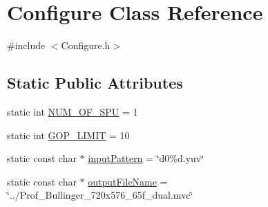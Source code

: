\hypertarget{class_configure}{
\section{Configure Class Reference}
\label{class_configure}
}


{\ttfamily \#include $<$Configure.h$>$}

\subsection*{Static Public Attributes}
\begin{DoxyCompactItemize}
\item 
static int \hyperlink{class_configure_ac48067b7f9d47427e932b4c44f4c9248}{NUM\_\-OF\_\-SPU} = 1
\item 
static int \hyperlink{class_configure_a0a595a8bf2825d2238fa77b2ecff2c5a}{GOP\_\-LIMIT} = 10
\item 
static const char $\ast$ \hyperlink{class_configure_aa6d6606a0e2fb33b2f828f207df7e140}{inputPattern} = \char`\"{}d0\%d.yuv\char`\"{}
\item 
static const char $\ast$ \hyperlink{class_configure_a0e7dd4e79c40df653c7ca73ecbab5d39}{outputFileName} = \char`\"{}../Prof\_\-Bullinger\_\-720x576\_\-65f\_\-dual.mvc\char`\"{}
\end{DoxyCompactItemize}


